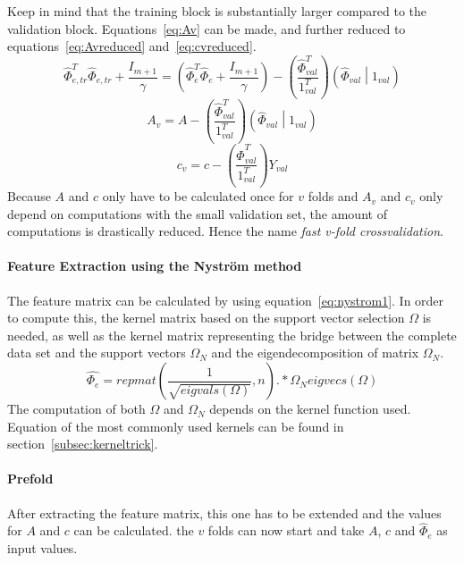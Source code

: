 Keep in mind that the training block is substantially larger compared to the validation block.
Equations~\ref{eq:Av}  can be made, and further reduced to equations~\ref{eq:Avreduced} and~\ref{eq:cvreduced}.
\begin{equation}
\hat{\Phi}_{e,tr}^T\hat{\Phi}_{e,tr} + \frac{I_{m+1}}{\gamma} = \left(  \hat{\Phi}_e^T\hat{\Phi}_e + \frac{I_{m+1}}{\gamma} \right) - \left( \frac{\hat{\Phi}_{val}^T}{1_{val}^T}\right) \left( \hat{\Phi}_{val} \middle| 1_{val} \right)
\label{eq:Av}
\end{equation}
\begin{equation}
A_v = A - \left( \frac{\hat{\Phi}_{val}^T}{1_{val}^T}\right) \left( \hat{\Phi}_{val} \middle| 1_{val} \right)
\label{eq:Avreduced}
\end{equation}
\begin{equation}
c_v = c - \left( \frac{\hat{\Phi}_{val}^T}{1_{val}^T}\right) Y_{val}
\label{eq:cvreduced}
\end{equation}
Because $A$ and $c$ only have to be calculated once for $v$ folds and $A_v$ and $c_v$ only depend on computations with the small validation set, the amount of computations is drastically reduced.
Hence the name \textit{fast v-fold crossvalidation}.
\paragraph{Feature Extraction using the Nystr\"om method}
The feature matrix can be calculated by using equation~\ref{eq:nystrom1}.
In order to compute this, the kernel matrix based on the support vector selection $\Omega$ is needed, as well as the kernel matrix representing the bridge between the complete data set and the support vectors $\Omega_N$ and the eigendecomposition of matrix $\Omega_N$.
\begin{equation}
\hat{\Phi_e}= repmat(\frac{1}{\sqrt{eigvals(\Omega)}},n).*\Omega_N eigvecs(\Omega)
\label{eq:nystrom1}
\end{equation}
The computation of both $\Omega$ and $\Omega_N$ depends on the kernel function used.
Equation of the most commonly used kernels can be found in section~\ref{subsec:kerneltrick}.
\paragraph{Prefold} 
After extracting the feature matrix, this one has to be extended and the values for $A$ and $c$ can be calculated.
the $v$ folds can now start and take $A$, $c$ and $\hat{\Phi}_e$ as input values.
